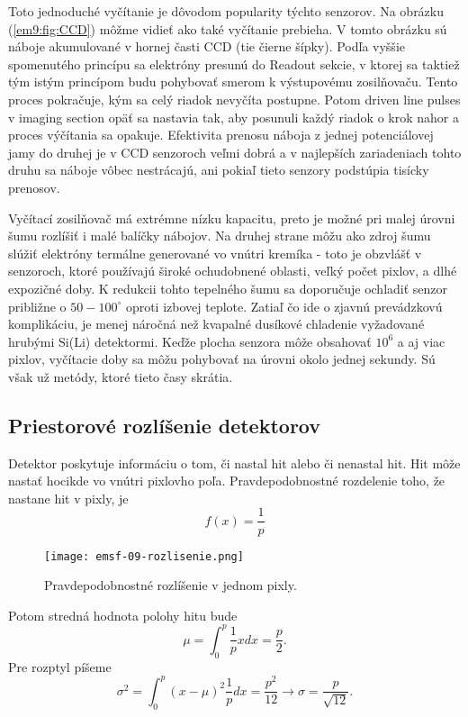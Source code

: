 \documentclass[../../main.tex]{subfiles}
\begin{document}
Toto jednoduché vyčítanie je dôvodom popularity týchto senzorov. Na obrázku (\ref{em9:fig:CCD}) môžme vidieť ako také vyčítanie prebieha. V tomto obrázku sú náboje akumulované v hornej časti CCD (tie čierne šípky). Podľa vyššie spomenutého princípu sa elektróny presunú do Readout sekcie, v ktorej sa taktiež tým istým princípom budu pohybovať smerom k výstupovému zosilňovaču. Tento proces pokračuje, kým sa celý riadok nevyčíta postupne. Potom driven line pulses v imaging section opäť sa nastavia tak, aby posunuli každý riadok o krok nahor a proces výčítania sa opakuje. Efektivita prenosu náboja z jednej potenciálovej jamy do druhej je v CCD senzoroch veľmi dobrá a v najlepších zariadeniach tohto druhu sa náboje vôbec nestrácajú, ani pokiaľ tieto senzory podstúpia tisícky prenosov.

Vyčítací zosilňovač má extrémne nízku kapacitu, preto je možné pri malej úrovni šumu rozlíšiť i malé balíčky nábojov. Na druhej strane môžu ako zdroj šumu slúžiť elektróny termálne generované vo vnútri kremíka - toto je obzvlášť v senzoroch, ktoré používajú široké ochudobnené oblasti, veľký počet pixlov, a dlhé expozičné doby. K redukcii tohto tepelného šumu sa doporučuje ochladiť senzor približne o $50-100^{\circ}$ oproti izbovej teplote. Zatiaľ čo ide o zjavnú prevádzkovú komplikáciu, je menej náročná než kvapalné dusíkové chladenie vyžadované hrubými Si(Li) detektormi. Keďže plocha senzora môže obsahovať $10^6$ a aj viac pixlov, vyčítacie doby sa môžu pohybovať na úrovni okolo jednej sekundy. Sú však už metódy, ktoré tieto časy skrátia.

\subsection{Priestorové rozlíšenie detektorov} 
Detektor poskytuje informáciu o tom, či nastal hit alebo či nenastal hit. Hit môže nastať hocikde vo vnútri pixlovho poľa. Pravdepodobnostné rozdelenie toho, že nastane hit v pixly, je 
$$ f(x) = \frac{1}{p} $$

\begin{figure}[!h]
\texttt{[image: emsf-09-rozlisenie.png]}
\centering
\caption{Pravdepodobnostné rozlíšenie v jednom pixly.}
\label{em9:fig:rozlisenie}
\end{figure}

Potom stredná hodnota polohy hitu bude 
$$ \mu = \int_0^p \frac{1}{p}x dx  = \frac{p}{2}.$$
Pre rozptyl píšeme 
$$ \sigma^2 = \int_0^p (x-\mu)^2 \frac{1}{p}dx = \frac{p^2}{12} \rightarrow \sigma = \frac{p}{\sqrt{12}}.$$
\end{document}

